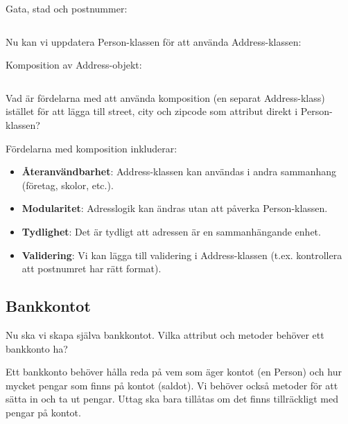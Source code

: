 \begin{frame}[fragile]
  \begin{example}[Adressklass]
    Gata, stad och postnummer:
    \inputminted[linenos,firstline=12,lastline=19]{python}{examples/bank.py}
  \end{example}
\end{frame}

Nu kan vi uppdatera Person-klassen för att använda Address-klassen:

\begin{frame}[fragile]
  \begin{example}
    Komposition av Address-objekt:
    \inputminted[linenos,firstline=21,lastline=28]{python}{examples/bank.py}
  \end{example}
\end{frame}

\begin{exercise}
  Vad är fördelarna med att använda komposition (en separat Address-klass) 
  istället för att lägga till street, city och zipcode som attribut direkt 
  i Person-klassen?
\end{exercise}

Fördelarna med komposition inkluderar:
\begin{itemize}
  \item \textbf{Återanvändbarhet}: Address-klassen kan användas i andra 
    sammanhang (företag, skolor, etc.).
  \item \textbf{Modularitet}: Adresslogik kan ändras utan att påverka 
    Person-klassen.
  \item \textbf{Tydlighet}: Det är tydligt att adressen är en sammanhängande 
    enhet.
  \item \textbf{Validering}: Vi kan lägga till validering i Address-klassen 
    (t.ex. kontrollera att postnumret har rätt format).
\end{itemize}

\subsection{Bankkontot}

\begin{exercise}
  Nu ska vi skapa själva bankkontot. Vilka attribut och metoder behöver 
  ett bankkonto ha?
\end{exercise}

Ett bankkonto behöver hålla reda på vem som äger kontot (en Person) och hur 
mycket pengar som finns på kontot (saldot). Vi behöver också metoder för att 
sätta in och ta ut pengar. Uttag ska bara tillåtas om det finns tillräckligt 
med pengar på kontot.


